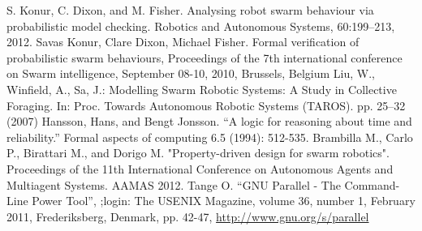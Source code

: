 \documentclass[11pt]{article}
\theoremstyle{definition}
\begin{document}
\begin{thebibliography}{99}
        S. Konur, C. Dixon, and M. Fisher.
        Analysing robot swarm behaviour via probabilistic model checking.
        Robotics and Autonomous Systems, 60:199–213,
        2012.
        Savas Konur, Clare Dixon, Michael Fisher.
        Formal verification of probabilistic swarm behaviours,
        Proceedings of the 7th international conference on Swarm intelligence,
        September 08-10, 2010, Brussels, Belgium
        Liu, W., Winfield, A., Sa, J.:
        Modelling Swarm Robotic Systems: A Study in Collective Foraging.
        In: Proc. Towards Autonomous Robotic Systems (TAROS).
        pp. 25–32 (2007)
        Hansson, Hans, and Bengt Jonsson.
        ``A logic for reasoning about time and reliability.''
        Formal aspects of computing 6.5 (1994): 512-535.
        Brambilla M., Carlo P., Birattari M., and Dorigo M.
        "Property-driven design for swarm robotics".
        Proceedings of the 11th International Conference on
        Autonomous Agents and Multiagent Systems.
        AAMAS 2012.
        Tange O.
        ``GNU Parallel - The Command-Line Power Tool'',
        ;login: The USENIX Magazine,
        volume 36, number 1, February 2011,
        Frederiksberg, Denmark,
        pp. 42-47,
        \url{http://www.gnu.org/s/parallel}
\end{thebibliography}
\end{document}
